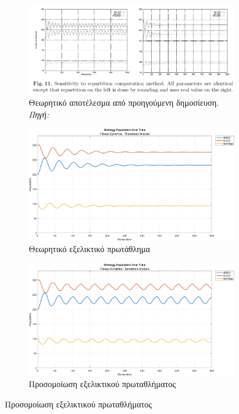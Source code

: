 \documentclass[12pt]{report}
\begin{document}
\begin{figure}[htbp]
    \centering

    \begin{subfigure}[b]{0.5\linewidth}
        \centering
        \includegraphics[width=\linewidth]{Figures Fitness Dynamics/11.png}
        \caption{Θεωρητικό αποτέλεσμα από προηγούμενη δημοσίευση. \textit{Πηγή:} \protect\cite{mathieu1999}}
        \label{fig:fig_fit_11_a}
    \end{subfigure}
    \hfill
    \begin{subfigure}[b]{0.5\linewidth}
        \centering
        \includegraphics[width=\linewidth]{Figures Fitness Dynamics/example11a.png}
        \caption{Θεωρητικό εξελικτικό πρωτάθλημα}
        \label{fig:fig_fit_11a_b}
    \end{subfigure}
    \hfill
    \begin{subfigure}[b]{0.5\linewidth}
        \centering
        \includegraphics[width=\linewidth]{Figures Fitness Dynamics/example11a-sim.png}
        \caption{Προσομοίωση εξελικτικού πρωταθλήματος}
        \label{fig:fig_fit_11a_c}
        

\end{subfigure}
\end{figure}
\end{document}
